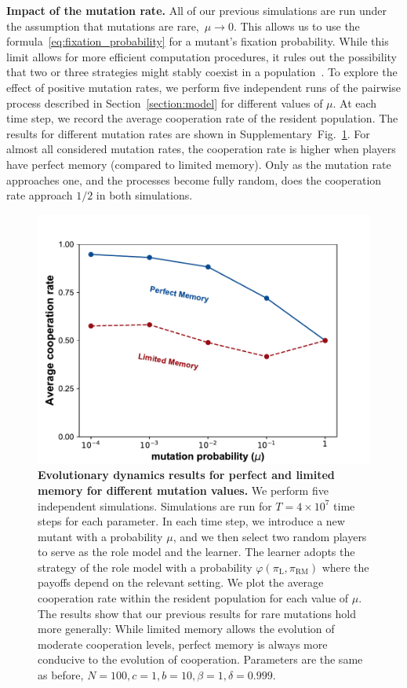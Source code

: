 \documentclass[11pt]{article}
\def\rolemodel{\text{RM}}
\def\learner{\text{L}}
\theoremstyle{plainCl1}
\theoremstyle{plainCl2}
\begin{document}

\noindent
{\bf Impact of the mutation rate.} 
All of our previous simulations are run under the assumption that mutations are rare,~$\mu\!\rightarrow\!0$. 
This allows us to use the formula~\eqref{eq:fixation_probability} for a mutant's fixation probability. 
While this limit allows for more efficient computation procedures, it rules out the possibility that two or three strategies might stably coexist in a population~\cite{tkadlec:pnas:2023}.
To explore the effect of positive mutation rates, we perform five independent runs of the pairwise process described in
Section~\ref{section:model} for different values of $\mu$.
At each time step, we record the average cooperation rate of the resident population. 
The results for different mutation rates are shown in Supplementary~Fig.~\ref{fig:mutation}. 
For almost all considered mutation rates, the cooperation rate is higher when players have perfect memory (compared to limited memory).
Only as the mutation rate approaches one, and the processes become fully random, does the cooperation rate approach $1/2$ in both simulations.

\begin{figure}[t!]
	\centering 
	\includegraphics[width=.5\textwidth]{static/mutation_perfect_and_limited_memory_donation_game.pdf}
	\caption{\textbf{Evolutionary dynamics results for perfect and limited memory
			for different mutation values.}
		We perform five independent simulations. Simulations are run
		for $T\!=\!4\times 10^7$ time steps for each parameter. In each time step,
		we introduce a new mutant with a probability \(\mu\), and we then select
		two random players to serve as the role model and the learner. The learner
		adopts the strategy of the role model with a probability \(\varphi(\pi_\learner, \pi_\rolemodel)\) where the
		payoffs depend on the relevant setting. We plot the average cooperation rate
		within the resident population for each value of \(\mu\). 
		The results show that our previous results for rare mutations hold more generally:
		While limited memory allows the evolution of moderate cooperation levels, perfect memory is always more conducive to the evolution of cooperation. 
		Parameters are the same as before, \(N =100, c=1, b=10, \beta=1, \delta=0.999\).}\label{fig:mutation}
\end{figure}
\end{document}

